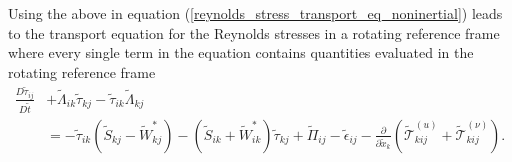 \documentclass[oneside,a4paper,11pt]{report}
\newcommand{\rs}{\tau}          %
\begin{document}
Using the above in equation (\ref{reynolds_stress_transport_eq_noninertial}) leads to the transport equation for the Reynolds stresses in a rotating reference frame where every single term in the equation contains quantities evaluated in the rotating reference frame
\begin{align}
\frac{D \tilde{\rs}_{ij} }{D \tilde{t}} &+ \tilde{\Lambda}_{ik} \tilde{\rs}_{kj} - \tilde{\rs}_{ik} \tilde{\Lambda}_{kj} \nonumber \\
&=  -\tilde{\rs}_{ik} (\tilde{S}_{kj} - \tilde{W}^*_{kj}) - (\tilde{S}_{ik} + \tilde{W}^*_{ik} ) \tilde{\rs}_{kj} + \tilde{\Pi}_{ij} - \tilde{\epsilon}_{ij} - \frac{\partial}{\partial \tilde{x}_k} \left ( \tilde{\mathcal{T}}^{(u)}_{kij} + \tilde{\mathcal{T}}^{(\nu)}_{kij} \right ).
\end{align}

\end{document}
